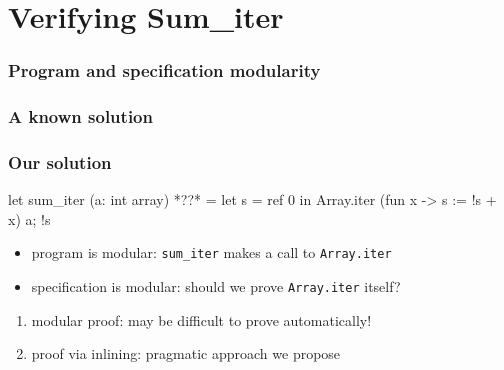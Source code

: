 \documentclass[xcolor=dvipsnames]{beamer}
\newcommand{\OliveGreen}[1]{\textcolor{OliveGreen}{#1}}
\begin{document}
\section*{Verifying Sum_iter}
\begin{frame}[fragile]
\frametitle<1>{Program and specification modularity}
\frametitle<2>{A known solution}
\frametitle<3>{Our solution}
\begin{whycode}
 let sum_iter (a: int array) *??* 
 = let s = ref 0 in
   Array.iter 
     (fun x ->  s := !s + x) a; 
   !s 
\end{whycode}
\begin{itemize}
\item \textsf{{\blue program is modular}: \texttt{sum\_iter} makes a call to \texttt{Array.iter}}
\item \textsf{{\blue specification is modular}: should we prove  \texttt{Array.iter}} itself? \pause
\end{itemize}
\begin{enumerate}
\item  \textsf{{modular proof:} {\red may be difficult to prove automatically!}} \pause
\item \textsf{proof via inlining: \OliveGreen{pragmatic approach we propose}}
\end{enumerate}
\end{frame}
\end{document}
